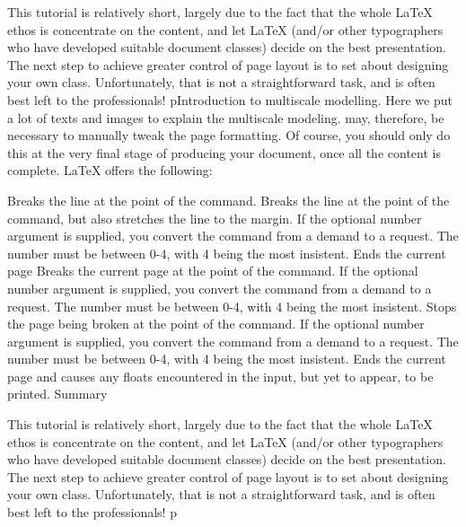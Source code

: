 \documentclass[a0paper]{article}
\begin{document}
\begin{multicols}{3}
This tutorial is relatively short, largely due to the fact that the whole LaTeX
ethos is concentrate on the content, and let LaTeX (and/or other typographers
who have developed suitable document classes) decide on the best presentation.
The next step to achieve greater control of page layout is to set about
designing your own class. Unfortunately, that is not a straightforward task, and
is often best left to the professionals! 
pIntroduction to multiscale modelling. Here we put a lot of texts and images to
explain the multiscale modeling.  may, therefore, be necessary to manually tweak
the page formatting. Of course, you should only do this at the very final stage
of producing your document, once all the content is complete. LaTeX offers the
following:


Breaks the line at the point of the command.  Breaks the line at the point of
the command, but also stretches the line to the margin. If the optional number
argument is supplied, you convert the command from a demand to a request. The
number must be between 0-4, with 4 being the most insistent.  Ends the current
page Breaks the current page at the point of the command. If the optional number
argument is supplied, you convert the command from a demand to a request. The
number must be between 0-4, with 4 being the most insistent.  Stops the page
being broken at the point of the command. If the optional number argument is
supplied, you convert the command from a demand to a request. The number must be
between 0-4, with 4 being the most insistent.  Ends the current page and causes
any floats encountered in the input, but yet to appear, to be printed.  Summary

This tutorial is relatively short, largely due to the fact that the whole LaTeX
ethos is concentrate on the content, and let LaTeX (and/or other typographers
who have developed suitable document classes) decide on the best presentation.
The next step to achieve greater control of page layout is to set about
designing your own class. Unfortunately, that is not a straightforward task, and
is often best left to the professionals! 
p

\end{multicols}
\end{document}
